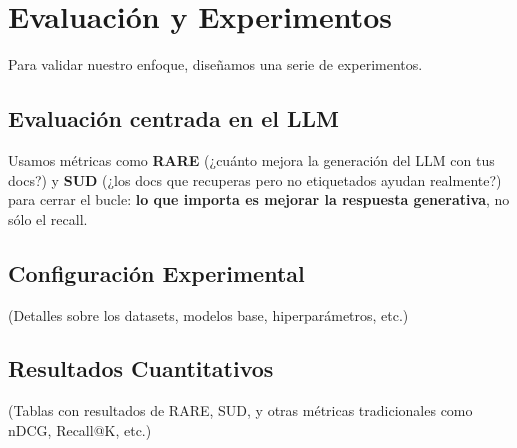 \section{Evaluación y Experimentos}
Para validar nuestro enfoque, diseñamos una serie de experimentos.

\subsection{Evaluación centrada en el LLM}
Usamos métricas como \textbf{RARE} (¿cuánto mejora la generación del LLM con tus docs?) y \textbf{SUD} (¿los docs que recuperas pero no etiquetados ayudan realmente?) para cerrar el bucle: \textbf{lo que importa es mejorar la respuesta generativa}, no sólo el recall.

\subsection{Configuración Experimental}
(Detalles sobre los datasets, modelos base, hiperparámetros, etc.)

\subsection{Resultados Cuantitativos}
(Tablas con resultados de RARE, SUD, y otras métricas tradicionales como nDCG, Recall@K, etc.)
